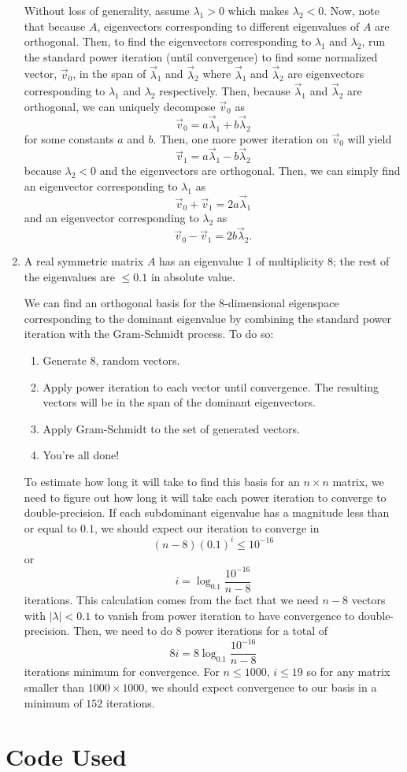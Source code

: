 \documentclass[a4paper,12pt]{article}
\newcommand{\abs}[1]{\left| #1 \right|}
\begin{document}
\begin{enumerate}[label = (\arabic*)]
	Without loss of generality, assume $ \lambda_1 > 0 $ which makes $ \lambda_2 < 0 $. Now, note that because $ A $, eigenvectors corresponding to different eigenvalues of $ A $ are orthogonal. Then, to find the eigenvectors corresponding to $ \lambda_1 $ and $ \lambda_2 $, run the standard power iteration (until convergence) to find some normalized vector, $ \vec{v}_0 $, in the span of $ \vec{\lambda}_1 $ and $ \vec{\lambda}_2 $ where $ \vec{\lambda}_1 $ and $ \vec{\lambda}_2 $ are eigenvectors corresponding to $ \lambda_1 $ and $ \lambda_2 $ respectively. Then, because $ \vec{\lambda}_1 $ and $ \vec{\lambda}_2 $ are orthogonal, we can uniquely decompose $ \vec{v}_0 $ as 
	\[
		\vec{v}_0 = a \vec{\lambda}_1 + b \vec{\lambda}_2
	\]
	for some constants $ a $ and $ b $. Then, one more power iteration on $ \vec{v}_0 $ will yield
	\[
		\vec{v}_1 = a \vec{\lambda}_1 - b \vec{\lambda}_2
	\]
	because $ \lambda_2 < 0 $ and the eigenvectors are orthogonal. Then, we can simply find an eigenvector corresponding to $ \lambda_1 $ as
	\[
		\vec{v}_0 + \vec{v}_1 = 2a \vec{\lambda}_1
	\]
	and an eigenvector corresponding to $ \lambda_2 $ as 
	\[
		\vec{v}_0 - \vec{v}_1 = 2b \vec{\lambda}_2.
 	\]
 	
 	\newpage
 	\item A real symmetric matrix $ A $ has an eigenvalue 1 of multiplicity $ 8 $; the rest of the eigenvalues are $ \leq 0.1 $ in absolute value.
 	
 	We can find an orthogonal basis for the $ 8 $-dimensional eigenspace corresponding to the dominant eigenvalue by combining the standard power iteration with the Gram-Schmidt process. To do so:
 	
 	\begin{enumerate}[label = (\roman*)]
 		\item Generate 8, random vectors.
 		\item Apply power iteration to each vector until convergence. The resulting vectors will be in the span of the dominant eigenvectors.
 		\item Apply Gram-Schmidt to the set of generated vectors.
 		\item You're all done!
 	\end{enumerate}
 	
 	To estimate how long it will take to find this basis for an $ n \times n $ matrix, we need to figure out how long it will take each power iteration to converge to double-precision. If each subdominant eigenvalue has a magnitude less than or equal to $ 0.1 $, we should expect our iteration to converge in
 	\[
 		(n - 8) (0.1)^i \leq 10^{-16}
 	\]
 	or
 	\[
 		i = \log_{0.1} \frac{10^{-16}}{n - 8}
 	\]
 	iterations. This calculation comes from the fact that we need $ n - 8 $ vectors with $ \abs{\lambda} < 0.1 $ to vanish from power iteration to have convergence to double-precision.
 	Then, we need to do 8 power iterations for a total of 
 	\[
 		8 i = 8 \log_{0.1} \frac{10^{-16}}{n - 8}
 	\]
 	iterations minimum for convergence. For $ n \leq 1000 $, $ i \leq 19 $ so for any matrix smaller than $ 1000 \times 1000 $, we should expect convergence to our basis in a minimum of $ 152 $  iterations.
\end{enumerate}

\newpage
\section*{Code Used}\label{sec:code}
\end{document}
